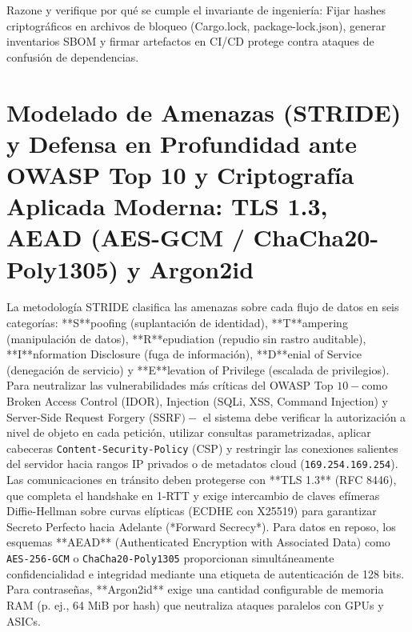 \documentclass{book}
\begin{document}
\begin{tcolorbox}[title={Autoficha}, studiumcheck, breakable]

Razone y verifique por qué se cumple el invariante de ingeniería: Fijar hashes criptográficos en archivos de bloqueo (Cargo.lock, package-lock.json), generar inventarios SBOM y firmar artefactos en CI/CD protege contra ataques de confusión de dependencias.
\end{tcolorbox}

\section{Modelado de Amenazas (STRIDE) y Defensa en Profundidad ante OWASP Top 10 y Criptografía Aplicada Moderna: TLS 1.3, AEAD (AES-GCM / ChaCha20-Poly1305) y Argon2id}

La metodología STRIDE clasifica las amenazas sobre cada flujo de datos en seis categorías: **S**poofing (suplantación de identidad), **T**ampering (manipulación de datos), **R**epudiation (repudio sin rastro auditable), **I**nformation Disclosure (fuga de información), **D**enial of Service (denegación de servicio) y **E**levation of Privilege (escalada de privilegios). Para neutralizar las vulnerabilidades más críticas del OWASP Top \(10 -\)como Broken Access Control (IDOR), Injection (SQLi, XSS, Command Injection) y Server-Side Request Forgery (SSRF\()-\) el sistema debe verificar la autorización a nivel de objeto en cada petición, utilizar consultas parametrizadas, aplicar cabeceras \texttt{Content-Security-Policy} (CSP) y restringir las conexiones salientes del servidor hacia rangos IP privados o de metadatos cloud (\texttt{169.254.169.254}).
Las comunicaciones en tránsito deben protegerse con **TLS 1.3** (RFC 8446), que completa el handshake en 1-RTT y exige intercambio de claves efímeras Diffie-Hellman sobre curvas elípticas (ECDHE con X25519) para garantizar Secreto Perfecto hacia Adelante (*Forward Secrecy*). Para datos en reposo, los esquemas **AEAD** (Authenticated Encryption with Associated Data) como \texttt{AES-256-GCM} o \texttt{ChaCha20-Poly1305} proporcionan simultáneamente confidencialidad e integridad mediante una etiqueta de autenticación de 128 bits. Para contraseñas, **Argon2id** exige una cantidad configurable de memoria RAM (p. ej., 64 MiB por hash) que neutraliza ataques paralelos con GPUs y ASICs.
\end{document}
